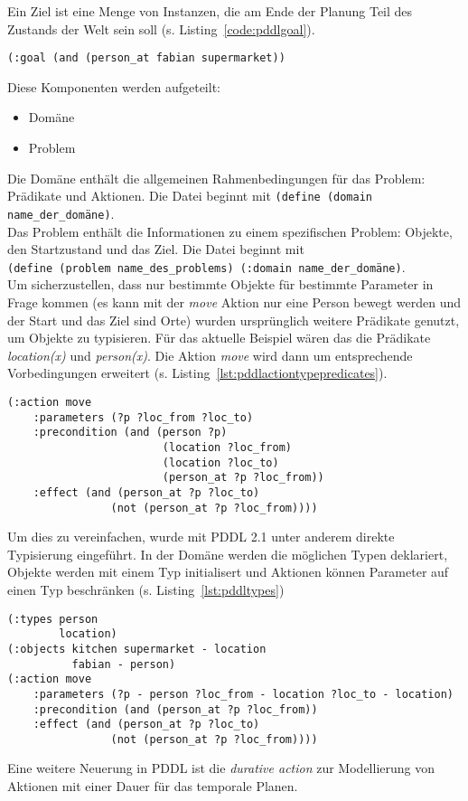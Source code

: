 Ein Ziel ist eine Menge von Instanzen, die am Ende der Planung Teil des Zustands der Welt sein soll (s. Listing~\ref{code:pddlgoal}).
\begin{lstlisting}[caption={Ziel in PDDL},language=pddl,label=code:pddlgoal]
(:goal (and (person_at fabian supermarket))
\end{lstlisting}
Diese Komponenten werden aufgeteilt:
\begin{itemize}
    \item Domäne
    \item Problem
\end{itemize}
Die Domäne enthält die allgemeinen Rahmenbedingungen für das Problem: Prädikate und Aktionen.
Die Datei beginnt mit \verb|(define (domain name_der_domäne)|.\\
Das Problem enthält die Informationen zu einem spezifischen Problem: Objekte, den Startzustand und das Ziel.
Die Datei beginnt mit\\\verb|(define (problem name_des_problems) (:domain name_der_domäne)|.\\
Um sicherzustellen, dass nur bestimmte Objekte für bestimmte Parameter in Frage kommen (es kann mit der \emph{move} Aktion nur eine Person bewegt werden und der Start und das Ziel sind Orte) wurden ursprünglich weitere Prädikate genutzt, um Objekte zu typisieren.
Für das aktuelle Beispiel wären das die Prädikate \emph{location(x)} und \emph{person(x)}.
Die Aktion \emph{move} wird dann um entsprechende Vorbedingungen erweitert (s. Listing~\ref{lst:pddlactiontypepredicates}).
\begin{lstlisting}[caption={Move Aktion mit Prädikaten zur Typisierung},language=pddl,label={lst:pddlactiontypepredicates}]
(:action move
    :parameters (?p ?loc_from ?loc_to)
    :precondition (and (person ?p)
                        (location ?loc_from)
                        (location ?loc_to)
                        (person_at ?p ?loc_from))
    :effect (and (person_at ?p ?loc_to)
                (not (person_at ?p ?loc_from))))
\end{lstlisting}
Um dies zu vereinfachen, wurde mit \ac{PDDL} 2.1 unter anderem direkte Typisierung eingeführt.
In der Domäne werden die möglichen Typen deklariert, Objekte werden mit einem Typ initialisert und Aktionen können Parameter auf einen Typ beschränken (s. Listing~\ref{lst:pddltypes})
\begin{lstlisting}[caption={Typ Unterstützung in \ac{PDDL} 2.1},language=pddl,label={lst:pddltypes}]
(:types person
        location)
(:objects kitchen supermarket - location
          fabian - person)
(:action move
    :parameters (?p - person ?loc_from - location ?loc_to - location)
    :precondition (and (person_at ?p ?loc_from))
    :effect (and (person_at ?p ?loc_to)
                (not (person_at ?p ?loc_from))))
\end{lstlisting}
Eine weitere Neuerung in \ac{PDDL} ist die \emph{durative action} zur Modellierung von Aktionen mit einer Dauer für das temporale Planen.\\

